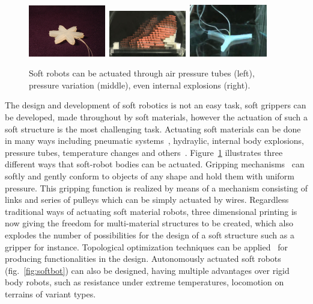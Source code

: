 \begin{figure}[t!]
\centering
\includegraphics[width=0.3\textwidth,height=0.13\textheight]{../Figures/Misc/soft_robotics_figure.png}\		
\includegraphics[width=0.3\textwidth,height=0.13\textheight]{../Figures/Misc/hillerPressureChamber.png}\	
\includegraphics[width=0.3\textwidth,height=0.13\textheight]{../Figures/Misc/ExplodingRobot.jpg}\\
\caption{Soft robots can be actuated through air pressure tubes (left), pressure variation (middle), even internal explosions (right).}
\label{fig:softRobotsActuation}
\end{figure}

The design and development of soft robotics is not an easy task, soft grippers can be developed, made throughout by soft materials, however the actuation of such a soft structure is the most challenging task. Actuating soft materials can be done in many ways including pneumatic systems~\cite{ilievski2011soft, shepherd2011multigait}, hydraylic, internal body explosions, pressure tubes, temperature changes and others~\cite{laschi2012soft, seok2010peristaltic}. Figure~\ref{fig:softRobotsActuation} illustrates three different ways that soft-robot bodies can be actuated. Gripping mechanisms~\cite{hirose1978development} can softly and gently conform to objects of any shape and hold them with uniform pressure. This gripping function is realized by means of a mechanism consisting of links and series of pulleys which can be simply actuated by wires. Regardless traditional ways of actuating soft material robots, three dimensional printing is now giving the freedom for multi-material structures to be created, which also explodes the number of possibilities for the design of a soft structure such as a gripper for instance. Topological optimization techniques can be applied~\cite{hiller2009multi} for producing functionalities in the design. Autonomously actuated soft robots~\cite{tolleyresilient} (fig.~\ref{fig:softbot}) can also be designed, having multiple advantages over rigid body robots, such as resistance under extreme temperatures, locomotion on terrains of variant types. 

